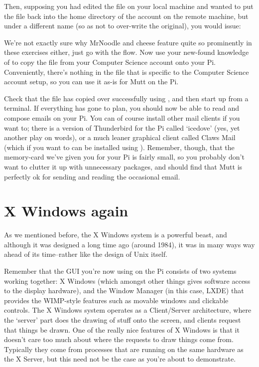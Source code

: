 Then, supposing you had edited the file  on your local machine and wanted to put the file back into the home directory of the  account on the remote machine, but under a different name (so as not to over-write the original), you would issue:


We're not exactly sure why MrNoodle and cheese feature quite so prominently in these exercises either, just go with the flow. Now use your new-found knowledge of  to copy the  file from your Computer Science account onto your Pi. Conveniently, there's nothing in the  file that is specific to the Computer Science account setup, so you can use it as-is for Mutt on the Pi. 

Check that the file has copied over successfully using , and then start up  from a terminal. If everything has gone to plan, you should now be able to read and compose emails on your Pi. You can of course install other mail clients if you want to; there is a version of Thunderbird for the Pi called `icedove' (yes, yet another play on words), or a much leaner graphical client called Claws Mail (which if you want to can be installed using ). Remember, though, that the memory-card we've given you for your Pi is fairly small, so you probably don't want to clutter it up with unnecessary packages, and should find that Mutt is perfectly ok for sending and reading the occasional email. 

\section{X Windows again}

As we mentioned before, the X Windows system is a powerful beast, and although it was designed a long time ago (around 1984), it was in many ways way ahead of its time--rather like the design of Unix itself.

Remember that the GUI you're now using on the Pi consists of two systems working together: X Windows (which amongst other things gives software access to the display hardware), and the Window Manager (in this case, LXDE) that provides the WIMP-style features such as movable windows and clickable controls. The X Windows system operates as a Client/Server architecture, where the `server' part does the drawing of stuff onto the screen, and clients request that things be drawn. One of the really nice features of X Windows is that it doesn't care too much about where the requests to draw things come from. Typically they come from processes that are running on the same hardware as the X Server, but this need not be the case as you're about to demonstrate.

